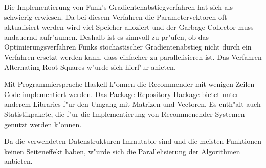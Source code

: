 \documentclass[a4paper, 12pt]{article}
\begin{document}
Die Implementierung von Funk's Gradientenabstiegverfahren hat sich als schwierig erwiesen. Da bei diesem Verfahren die Parametervektoren oft aktualisiert werden wird viel Speicher alloziert und der Garbage Collector muss andauernd aufr"aumen. Deshalb ist es sinnvoll zu pr"ufen, ob das Optimierungsverfahren Funks stochastischer Gradientenabstieg nicht durch ein Verfahren ersetzt werden kann, dass einfacher zu parallelisieren ist. Das Verfahren Alternating Root Squares w"urde sich hierf"ur anieten.

Mit Programmiersprache Haskell k"onnen die Recommender mit wenigen Zeilen Code implementiert werden. Das Package Repository Hackage bietet unter anderem Libraries f"ur den Umgang mit Matrizen und Vectoren. Es enth"alt auch Statistikpakete, die f"ur die Implementierung von Recommenender Systemen genutzt werden k"onnen.

Da die verwendeten Datenstrukturen Immutable sind und die meisten Funktionen keinen Seiteneffekt haben, w"urde sich die Parallelisierung der Algorithmen anbieten.



\end{document}
